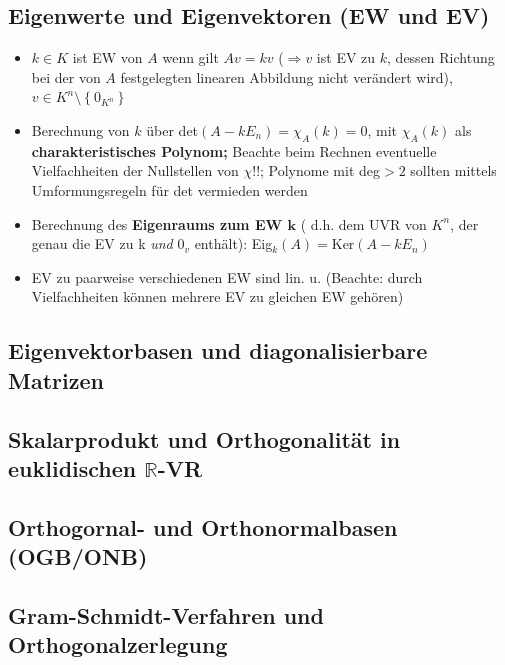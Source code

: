 \documentclass[10pt,a4paper]{article}
\begin{document}
\subsection{Eigenwerte und Eigenvektoren (EW und EV)}
\begin{itemize}
\item $k\in K$ ist EW von $A$ wenn gilt $Av=kv$ ($\Rightarrow v$ ist EV zu $k$, dessen Richtung bei der von $A$ festgelegten linearen Abbildung nicht verändert wird), $v\in K^{n}\setminus \left\lbrace 0_{K^{n}}\right\rbrace$
\item Berechnung von $k$ über det$(A-kE_{n})=\chi_{A}(k)=0$, mit $\chi_{A}(k)$ als \textbf{charakteristisches Polynom;} Beachte beim Rechnen eventuelle Vielfachheiten der Nullstellen von $\chi$!!; Polynome mit deg$>2$ sollten mittels  Umformungsregeln für det vermieden werden
\item Berechnung des \textbf{Eigenraums zum EW $\boldsymbol{k}$} ( d.h. dem UVR von $K^{n}$, der genau die EV zu k \textit{und} $0_{v}$ enthält): Eig$_{k}(A)=\text{Ker}(A-kE_{n})$
\item EV zu paarweise verschiedenen EW sind lin. u. (Beachte: durch Vielfachheiten können mehrere EV zu gleichen EW gehören)
\end{itemize}



\subsection{Eigenvektorbasen und diagonalisierbare Matrizen}



\subsection{Skalarprodukt und Orthogonalität in euklidischen $\mathbb{R}$-VR}



\subsection{Orthogornal- und Orthonormalbasen (OGB/ONB) }



\subsection{Gram-Schmidt-Verfahren und Orthogonalzerlegung}
\end{document}
